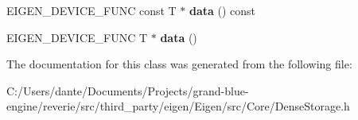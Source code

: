 \begin{DoxyCompactItemize}
E\+I\+G\+E\+N\+\_\+\+D\+E\+V\+I\+C\+E\+\_\+\+F\+U\+NC const T $\ast$ {\bfseries data} () const
\item 
\mbox{\label{class_eigen_1_1_dense_storage_3_01_t_00_01_dynamic_00_01_dynamic_00_01_dynamic_00_01___options_01_4_ae86198e62fa6c6fe5ce897eacfb631ab}} 
E\+I\+G\+E\+N\+\_\+\+D\+E\+V\+I\+C\+E\+\_\+\+F\+U\+NC T $\ast$ {\bfseries data} ()
\end{DoxyCompactItemize}


The documentation for this class was generated from the following file\+:\begin{DoxyCompactItemize}
\item 
C\+:/\+Users/dante/\+Documents/\+Projects/grand-\/blue-\/engine/reverie/src/third\+\_\+party/eigen/\+Eigen/src/\+Core/Dense\+Storage.\+h\end{DoxyCompactItemize}
